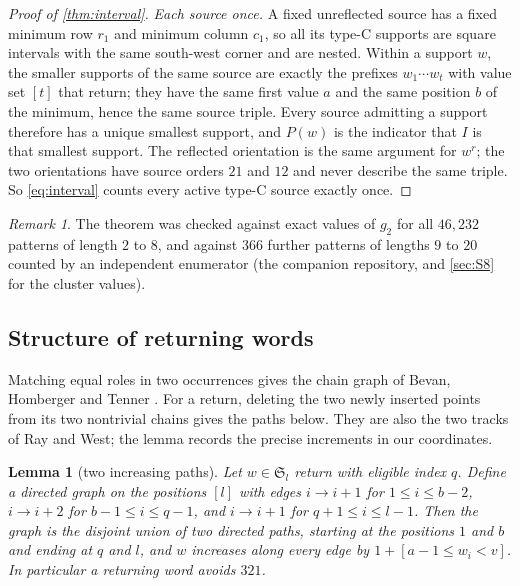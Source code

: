 \documentclass[11pt,reqno]{amsart}
\theoremstyle{plain}
\newtheorem{lemma}[lemma]{Lemma}
\theoremstyle{definition}
\theoremstyle{remark}
\newtheorem{remark}[remark]{Remark}
\newcommand{\Sym}{\mathfrak{S}}
\begin{document}
\begin{proof}[Proof of \cref{thm:interval}]
\emph{Each source once.} A fixed unreflected source has a fixed minimum row $r_1$ and minimum column $c_1$, so all its type-C supports are square intervals with the same south-west corner and are nested. Within a support $w$, the smaller supports of the same source are exactly the prefixes $w_1\cdots w_t$ with value set $[t]$ that return; they have the same first value $a$ and the same position $b$ of the minimum, hence the same source triple. Every source admitting a support therefore has a unique smallest support, and $P(w)$ is the indicator that $I$ is that smallest support. The reflected orientation is the same argument for $w^r$; the two orientations have source orders $21$ and $12$ and never describe the same triple. So \eqref{eq:interval} counts every active type-C source exactly once.
\end{proof}

\begin{remark}\label{rem:certB}
The theorem was checked against exact values of $g_2$ for all $46{,}232$ patterns of length $2$ to $8$, and against $366$ further patterns of lengths $9$ to $20$ counted by an independent enumerator (the companion repository, and \cref{sec:S8} for the cluster values).
\end{remark}

\subsection{Structure of returning words}

Matching equal roles in two occurrences gives the chain graph of
Bevan, Homberger and Tenner \cite[preprint, Def.~2.3 and Prop.~2.7]{BHT2018}.
For a return, deleting the two newly inserted points from its two
nontrivial chains gives the paths below. They are also the two tracks
of Ray and West; the lemma records the precise increments in our
coordinates.

\begin{lemma}[two increasing paths]\label{lem:paths}
Let $w\in\Sym_l$ return with eligible index $q$. Define a directed graph on the positions $[l]$ with edges $i\to i+1$ for $1\le i\le b-2$, $i\to i+2$ for $b-1\le i\le q-1$, and $i\to i+1$ for $q+1\le i\le l-1$. Then the graph is the disjoint union of two directed paths, starting at the positions $1$ and $b$ and ending at $q$ and $l$, and $w$ increases along every edge by $1+[a-1\le w_i<v]$. In particular a returning word avoids $321$.
\end{lemma}
\end{document}
